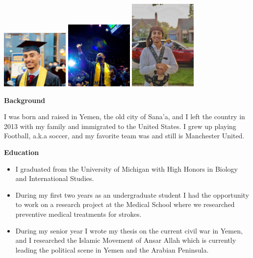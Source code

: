 \documentclass[
]{book}
\providecommand{\tightlist}{%
  \setlength{\itemsep}{0pt}\setlength{\parskip}{0pt}}
\begin{document}
\includegraphics[width=0.25\textwidth,height=\textheight]{jalal1.jpg}
\includegraphics[width=0.25\textwidth,height=\textheight]{jalal2.jpg}
\includegraphics[width=0.25\textwidth,height=\textheight]{jalal3.jpg}

\textbf{Background}

I was born and raised in Yemen, the old city of Sana'a, and I left the country in 2013 with my family and immigrated to the United States. I grew up playing Football, a.k.a soccer, and my favorite team was and still is Manchester United.

\textbf{Education}

\begin{itemize}
\tightlist
\item
  I graduated from the University of Michigan with High Honors in Biology and International Studies.
\item
  During my first two years as an undergraduate student I had the opportunity to work on a research project at the Medical School where we researched preventive medical treatments for strokes.
\item
  During my senior year I wrote my thesis on the current civil war in Yemen, and I researched the Islamic Movement of Ansar Allah which is currently leading the political scene in Yemen and the Arabian Peninsula.
\end{itemize}
\end{document}
